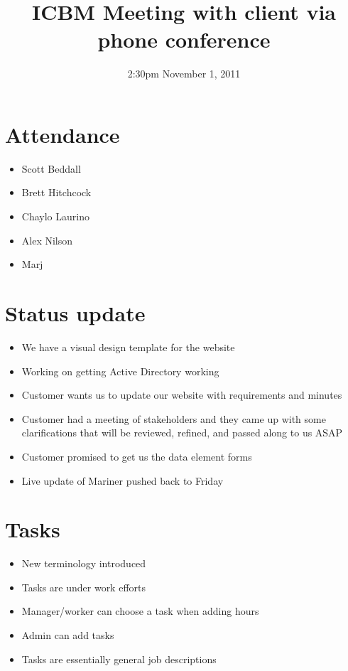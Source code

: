 \documentclass{article}
\begin{document}
\title{ICBM Meeting with client via phone conference}
\date{2:30pm November 1, 2011}
\maketitle

\section{Attendance}
\begin{itemize}
\item Scott Beddall
\item Brett Hitchcock
\item Chaylo Laurino
\item Alex Nilson
\item Marj
\end{itemize}

\section{Status update}
\begin{itemize}
\item We have a visual design template for the website
\item Working on getting Active Directory working
\item Customer wants us to update our website with requirements and minutes
\item Customer had a meeting of stakeholders and they came up with some clarifications that will be reviewed, refined, and passed along to us ASAP
\item Customer promised to get us the data element forms
\item Live update of Mariner pushed back to Friday
\end{itemize}

\section{Tasks}
\begin{itemize}
\item New terminology introduced
\item Tasks are under work efforts
\item Manager/worker can choose a task when adding hours
\item Admin can add tasks
\item Tasks are essentially general job descriptions
\end{itemize}
\end{document}
